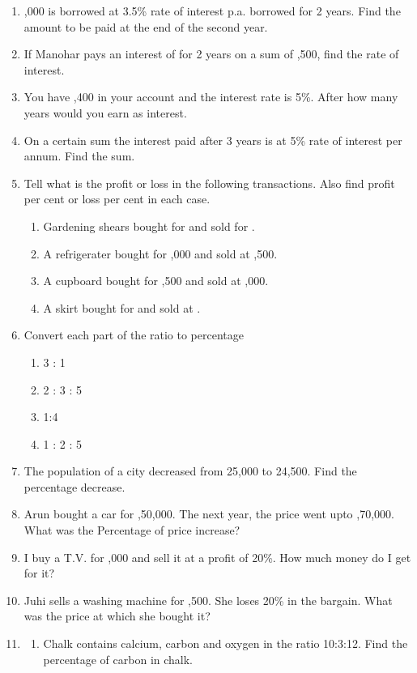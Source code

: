 \begin{enumerate}[label=\thesubsection.\arabic*,ref=\thesubsection.\theenumi,resume*]
\item  {},000 is borrowed at 3.5\% rate of interest p.a. borrowed for 2 years. Find the amount to be paid at the end of the second year.
\item If Manohar pays an interest of  for 2 years on a sum of ,500, find the rate of interest.
\item You have ,400 in your account and the interest rate is 5\%. After how many years would you earn  as interest.
\item On a certain sum the interest paid after 3 years is  at 5\% rate of interest per annum. Find the sum.
\item Tell what is the profit or loss in the following transactions. Also find profit per cent or loss per cent in each case. 
	\begin{enumerate}
\item  Gardening shears bought for  and sold for . 
\item  A refrigerater bought for ,000 and sold at ,500. 
\item  A cupboard bought for ,500 and sold at ,000. 
\item  A skirt bought for  and sold at .
	\end{enumerate}
\item Convert each part of the ratio to percentage
	\begin{enumerate}
		\item  3 : 1
		\item  2 : 3 : 5 
		\item  1:4 
		\item  1 : 2 : 5
	\end{enumerate}
\item  The population of a city decreased from 25,000 to 24,500. Find the percentage decrease.
\item  Arun bought a car for ,50,000. The next year, the price went upto ,70,000. What was the Percentage of price increase?
\item  I buy a T.V. for ,000 and sell it at a profit of 20\%. How much money do I get for it?
\item  Juhi sells a washing machine for ,500. She loses 20\% in the bargain. What was the price at which she bought it?
\item 
	\begin{enumerate}
		\item Chalk contains calcium, carbon and oxygen in the ratio 10:3:12. Find the percentage of carbon in chalk.

\end{enumerate}
\end{enumerate}
